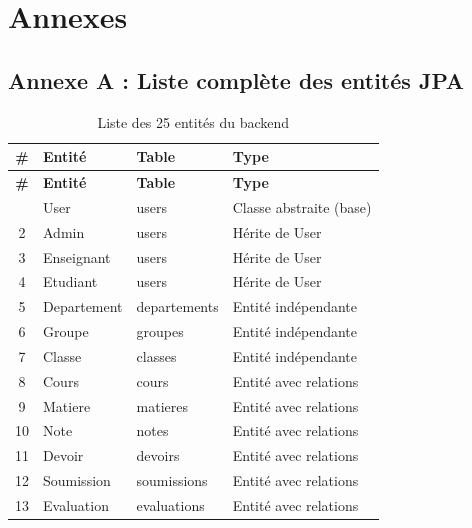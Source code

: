 \chapter*{Annexes}

\section*{Annexe A : Liste complète des entités JPA}

\begin{longtable}{clll}
\caption{Liste des 25 entités du backend} \\
\toprule
\textbf{\#} & \textbf{Entité} & \textbf{Table} & \textbf{Type} \\
\midrule
\endfirsthead
\toprule
\textbf{\#} & \textbf{Entité} & \textbf{Table} & \textbf{Type} \\
\midrule
\endhead
\bottomrule
\endfoot
1  & User           & users             & Classe abstraite (base) \\
2  & Admin          & users             & Hérite de User \\
3  & Enseignant     & users             & Hérite de User \\
4  & Etudiant       & users             & Hérite de User \\
5  & Departement    & departements      & Entité indépendante \\
6  & Groupe         & groupes           & Entité indépendante \\
7  & Classe         & classes           & Entité indépendante \\
8  & Cours          & cours             & Entité avec relations \\
9  & Matiere        & matieres          & Entité avec relations \\
10 & Note           & notes             & Entité avec relations \\
11 & Devoir         & devoirs           & Entité avec relations \\
12 & Soumission     & soumissions       & Entité avec relations \\
13 & Evaluation     & evaluations       & Entité avec relations \\

\end{longtable}
